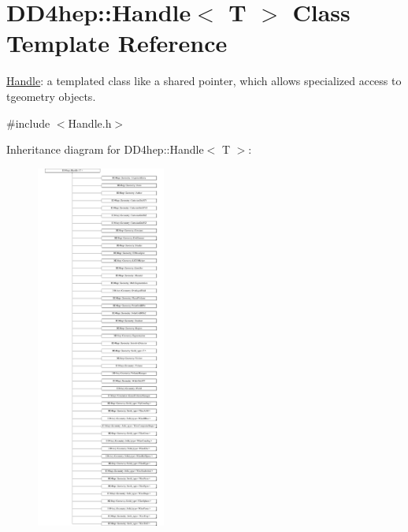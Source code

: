 \hypertarget{class_d_d4hep_1_1_handle}{}\section{D\+D4hep\+:\+:Handle$<$ T $>$ Class Template Reference}
\label{class_d_d4hep_1_1_handle}


\hyperlink{class_d_d4hep_1_1_handle}{Handle}\+: a templated class like a shared pointer, which allows specialized access to tgeometry objects.  




{\ttfamily \#include $<$Handle.\+h$>$}

Inheritance diagram for D\+D4hep\+:\+:Handle$<$ T $>$\+:\begin{figure}[H]
\begin{center}
\leavevmode
\includegraphics[height=12.000000cm]{class_d_d4hep_1_1_handle}
\end{center}
\end{figure}
